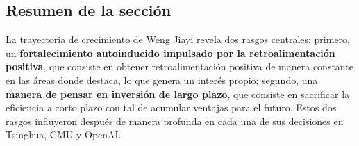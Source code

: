 \subsection{Resumen de la sección}

La trayectoria de crecimiento de Weng Jiayi revela dos rasgos centrales: primero, un \textbf{fortalecimiento autoinducido impulsado por la retroalimentación positiva}, que consiste en obtener retroalimentación positiva de manera constante en las áreas donde destaca, lo que genera un interés propio; segundo, una \textbf{manera de pensar en inversión de largo plazo}, que consiste en sacrificar la eficiencia a corto plazo con tal de acumular ventajas para el futuro. Estos dos rasgos influyeron después de manera profunda en cada una de sus decisiones en Tsinghua, CMU y OpenAI.
